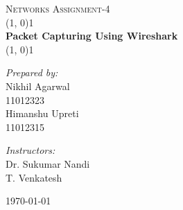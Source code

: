 \begin{titlepage}

\begin{center}

\textsc{\LARGE Networks Assignment-4}\\[2.5cm]

\linethickness{0.5mm}
\line(1, 0){1\linewidth} \\[0.2cm]
{\huge \bfseries Packet Capturing Using Wireshark } \\[0.4cm]
\line(1, 0){1\linewidth} \\[2.5cm]

\begin{minipage}[t]{0.4\textwidth}
	\begin{flushleft} \large
	\emph{Prepared by:} \\[0.3cm]
	Nikhil Agarwal \\
	{\small 11012323} \\[0.2cm]
	Himanshu Upreti \\
	{\small 11012315} \\[0.2cm]
	\end{flushleft}
\end{minipage}
\begin{minipage}[t]{0.4\textwidth}
	\begin{flushright} \large
	\emph{Instructors:} \\[0.3cm]
	Dr. Sukumar Nandi\\[0.2cm]
	T. Venkatesh\\
	\end{flushright}
\end{minipage}

\vfill

{\large \today}

\end{center}

\end{titlepage}